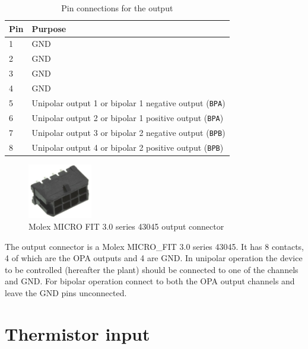 \documentclass[11pt]{report}
\begin{document}
\begin{table}[H]
	
	\centering

	\begin{tabular}{ll}
	\toprule
	Pin & Purpose  \\ \midrule
	1   & GND      \\
	2   & GND      \\
	3   & GND      \\
	4   & GND      \\
	5   & Unipolar output 1 or bipolar 1 negative output ({\tt BPA}) \\
	6   & Unipolar output 2 or bipolar 1 positive output ({\tt BPA}) \\
	7   & Unipolar output 3 or bipolar 2 negative output ({\tt BPB}) \\
	8   & Unipolar output 4 or bipolar 2 positive output ({\tt BPB}) \\ \bottomrule
	\end{tabular}

	\caption{Pin connections for the output}
	\label{tab:output_pins}

\end{table}

\begin{figure}
\centering
\includegraphics[width=0.25\textwidth]{MicroFit8}
\caption{Molex MICRO FIT 3.0 series 43045 output connector}
\end{figure}

The output connector is a Molex MICRO\_FIT 3.0 series 43045. It has 8 contacts, 4 of which are the OPA outputs and 4 are GND. In unipolar operation the device to be controlled (hereafter the plant) should be connected to one of the channels and GND. For bipolar operation connect to both the OPA output channels and leave the GND pins unconnected. 

\clearpage
\section{Thermistor input}
\end{document}
